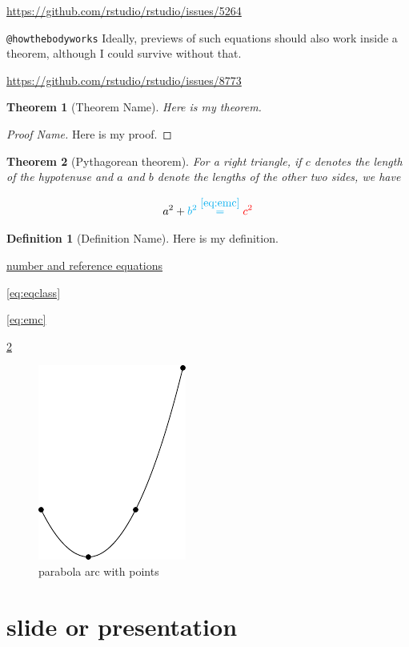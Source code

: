 \documentclass[
]{book}
\newtheorem{theorem}{Theorem}[chapter]
\theoremstyle{definition}
\newtheorem{definition}{Definition}[chapter]
\theoremstyle{definition}
\theoremstyle{definition}
\theoremstyle{definition}
\theoremstyle{remark}
\begin{document}
\url{https://github.com/rstudio/rstudio/issues/5264}

\texttt{@howthebodyworks} Ideally, previews of such equations should also work inside a theorem, although I could survive without that.

\url{https://github.com/rstudio/rstudio/issues/8773}

\begin{theorem}[Theorem Name]
\protect\hypertarget{thm:label}{}\label{thm:label}Here is my theorem.
\end{theorem}

\begin{proof}[Proof Name]
Here is my proof.
\end{proof}

\begin{theorem}[Pythagorean theorem]
\protect\hypertarget{thm:pyth}{}\label{thm:pyth}For a right triangle, if \(c\) denotes the length of the hypotenuse
and \(a\) and \(b\) denote the lengths of the other two sides, we have

\[a^2 + \color{cyan}b^2 \overset{\ref{eq:emc}}= \color{red}{c^2} \]
\end{theorem}

\begin{definition}[Definition Name]
\protect\hypertarget{def:unnamed-chunk-45}{}\label{def:unnamed-chunk-45}Here is my definition.
\end{definition}

\protect\hyperlink{nice-label}{number and reference equations}

\eqref{eq:eqclass}

\eqref{eq:emc}

\ref{thm:pyth}

\begin{figure}
\includegraphics[width=0.25\linewidth]{202401280001-test_files/figure-latex/parabola-arc-with-points-1} \caption{parabola arc with points}\label{fig:parabola-arc-with-points}
\end{figure}

\hypertarget{slide-or-presentation}{%
\section{slide or presentation}\label{slide-or-presentation}}
\end{document}
